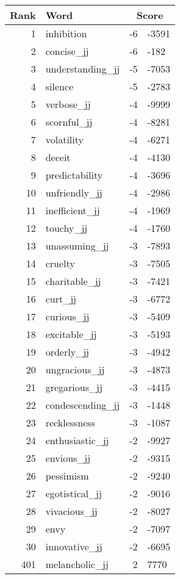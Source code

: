 \begin{longtable}[!htbp]{| rlr@{.}l |}
    \hline
    \textbf{Rank} & \textbf{Word} & \multicolumn{2}{c|}{\textbf{Score}} \\
    \hline
    \endhead
    1 & inhibition & -6 & -3591 \\
    2 & concise\_jj & -6 & -182 \\
    3 & understanding\_jj & -5 & -7053 \\
    4 & silence & -5 & -2783 \\
    5 & verbose\_jj & -4 & -9999 \\
    6 & scornful\_jj & -4 & -8281 \\
    7 & volatility & -4 & -6271 \\
    8 & deceit & -4 & -4130 \\
    9 & predictability & -4 & -3696 \\
    10 & unfriendly\_jj & -4 & -2986 \\
    11 & inefficient\_jj & -4 & -1969 \\
    12 & touchy\_jj & -4 & -1760 \\
    13 & unassuming\_jj & -3 & -7893 \\
    14 & cruelty & -3 & -7505 \\
    15 & charitable\_jj & -3 & -7421 \\
    16 & curt\_jj & -3 & -6772 \\
    17 & curious\_jj & -3 & -5409 \\
    18 & excitable\_jj & -3 & -5193 \\
    19 & orderly\_jj & -3 & -4942 \\
    20 & ungracious\_jj & -3 & -4873 \\
    21 & gregarious\_jj & -3 & -4415 \\
    22 & condescending\_jj & -3 & -1448 \\
    23 & recklessness & -3 & -1087 \\
    24 & enthusiastic\_jj & -2 & -9927 \\
    25 & envious\_jj & -2 & -9315 \\
    26 & pessimism & -2 & -9240 \\
    27 & egotistical\_jj & -2 & -9016 \\
    28 & vivacious\_jj & -2 & -8027 \\
    29 & envy & -2 & -7097 \\
    30 & innovative\_jj & -2 & -6695 \\
    401 & melancholic\_jj & 2 & 7770 \\

\end{longtable}
